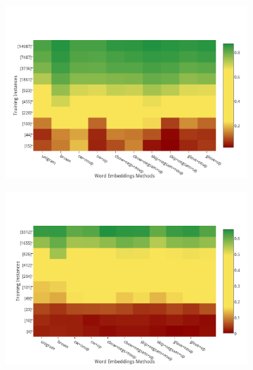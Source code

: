 \begin{figure}
\begin{subfigure}{7cm}
	\label{chu}
\end{subfigure}
\begin{subfigure}{7cm}
	\centering
    \includegraphics[scale=0.4]{plots/map-ner-color-invert}    	
	\label{ner}
\end{subfigure}
\begin{subfigure}{7cm}
	\centering
    \includegraphics[scale=0.4]{plots/map-mwe-color-invert}
	\label{mwe}
\end{subfigure}
\label{fig:heatmaps}
\end{figure}


